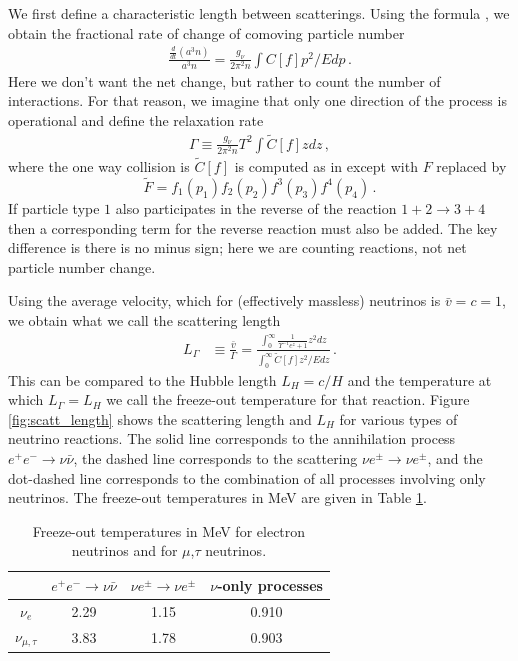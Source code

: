 We first define a characteristic length between scatterings. Using the formula , we obtain the fractional rate of change of comoving particle number
\begin{align}
\frac{\frac{d}{dt}(a^3 n)}{a^3n}=\frac{g_\nu}{2\pi^2n}\int C[f]p^2/Edp\,.
\end{align}
Here we don't want the net change, but rather to count the number of interactions.  For that reason, we imagine that only one direction of the process is operational and define the relaxation rate
\begin{align}
\Gamma\equiv\frac{g_\nu}{2\pi^2n}T^2\int \tilde C[f]zdz\,,
\end{align}
where the one way collision is $\tilde C[f]$ is computed as in  except with $F$ replaced by 
\begin{equation}
\tilde F=f_1(p_1)f_2(p_2)f^3(p_3)f^4(p_4)\,.
\end{equation}
If particle type $1$ also participates in the reverse of the reaction $1+2\rightarrow 3+4$ then a corresponding term for the reverse reaction must also be added.  The key difference is there is no minus sign; here we are counting reactions, not net particle number change.

Using the average velocity, which for (effectively massless) neutrinos is $\bar v=c=1$, we obtain what we call the scattering length
\begin{align}
L_\Gamma&\equiv\frac{\bar v}{\Gamma}=\frac{\int_0^\infty\frac{1}{\Upsilon^{-1}e^z+1}z^2dz}{\int_0^\infty \tilde C[f] z^2/E dz}\,.
\end{align}
This can be compared to the Hubble length $L_H=c/H$ and the temperature at which $L_\Gamma=L_H$ we call the freeze-out temperature for that reaction.  Figure \ref{fig:scatt_length} shows the scattering length and $L_H$ for various types of neutrino reactions.  The solid line corresponds to the annihilation process $e^+e^-\rightarrow \nu\bar\nu$, the dashed line corresponds to the scattering $\nu e^\pm\rightarrow \nu e^\pm$, and the dot-dashed line corresponds to the combination of all processes involving only neutrinos.  The freeze-out temperatures in MeV are given in Table \ref{table:freeze-out_temp}.

\begin{table}[ht]
\centering 
\begin{tabular}{|c|c|c|c|}
\hline
              & $e^+e^-\rightarrow \nu\bar\nu$ & $\nu e^\pm\rightarrow \nu e^\pm$ & $\nu$-only processes\\
\hline
$\nu_e$ &2.29 & 1.15&0.910\\
\hline
$\nu_{\mu,\tau}$ &3.83 & 1.78& 0.903\\
\hline
\end{tabular}
\caption{Freeze-out temperatures in MeV for electron neutrinos and for $\mu$,$\tau$ neutrinos.}
\label{table:freeze-out_temp}
\end{table}

